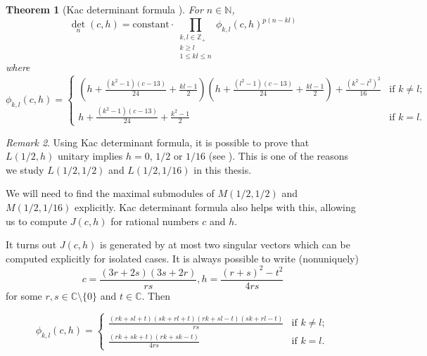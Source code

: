 \documentclass[a4paper, 12pt, reqno]{amsart}
\newtheorem{theorem}{Theorem}[section]
\theoremstyle{remark}
\newtheorem{remark}[theorem]{Remark}
\numberwithin{equation}{subsection}
\begin{document}
\begin{theorem}[Kac determinant formula {\cite[Theorem 4.2]{iohara_representation_2011}}]
  \label{thr:34}
  For $n \in \mathbb{N}$,
  \begin{equation*}
    \textstyle\det_n(c, h) = \displaystyle\text{constant}\cdot \prod_{\substack{k, l \in \mathbb{Z}_+\\k \ge l\\ 1 \le kl \le n}} \phi_{k, l}(c, h)^{p(n - kl)}
  \end{equation*}
  where
  \begin{equation*}
    \phi_{k, l}(c, h)=
    \begin{cases}
      (h + \frac{(k^2 - 1)(c - 13)}{24} + \frac{kl - 1}{2})(h + \frac{(l^2 - 1)(c - 13)}{24} + \frac{kl - 1}{2}) + \frac{(k^2 - l^2)^2}{16} &\text{if }k \neq l;\\
      h + \frac{(k^2 - 1)(c - 13)}{24} + \frac{k^2 - 1}{2} &\text{if }k = l.
    \end{cases}
  \end{equation*}
\end{theorem}

\begin{remark}
  \label{rmk:24}
  Using Kac determinant formula, it is possible to prove that $L(1/2, h)$ unitary implies $h = 0$, $1/2$ or $1/16$ (see \cite[\S3]{kac_bombay_2013}).
  This is one of the reasons we study $L(1/2, 1/2)$ and $L(1/2, 1/16)$ in this thesis.
\end{remark}

We will need to find the maximal submodules of $M(1/2, 1/2)$ and $M(1/2, 1/16)$ explicitly.
Kac determinant formula also helps with this, allowing us to compute $J(c, h)$ for rational numbers $c$ and $h$.

It turns out $J(c, h)$ is generated by at most two singular vectors which can be computed explicitly for isolated cases.
It is always possible to write (nonuniquely)
\begin{equation*}
  c = \frac{(3r + 2s)(3s + 2r)}{rs}, h = \frac{(r + s)^2 - t^2}{4rs}
\end{equation*}
for some $r, s \in \mathbb{C}\setminus\{0\}$ and $t \in \mathbb{C}$.
Then

\begin{equation*}
  \phi_{k, l}(c, h) =
  \begin{cases}
    \frac{(rk + sl + t)(sk + rl + t)(rk + sl - t)(sk + rl - t)}{rs} &\text{if } k \neq l;\\
    \frac{(rk + sk + t)(rk + sk - t)}{4rs} &\text{if } k = l.
  \end{cases}
\end{equation*}
\end{document}
